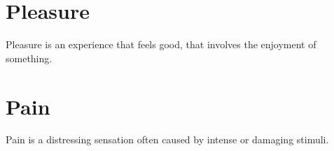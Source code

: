 \documentclass[a4paper]{article}
\title{}
\date{}
\begin{document}
    \maketitle
    
    
    \section{Pleasure}
        Pleasure is an experience that feels good, that involves the enjoyment of something.
    
    
    \section{Pain}
        Pain is a distressing sensation often caused by intense or damaging stimuli.
\end{document}
